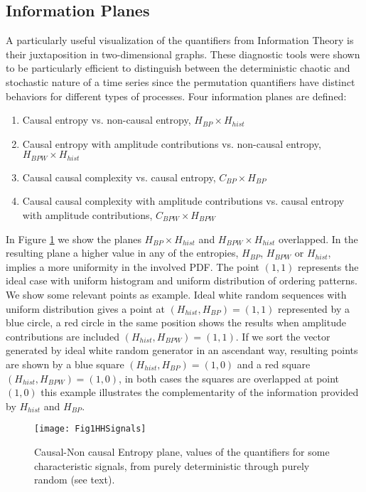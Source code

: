 \subsection{Information Planes}

A particularly useful visualization of the quantifiers from Information Theory is their juxtaposition in two-dimensional graphs.
These diagnostic tools were shown to be particularly efficient to distinguish between the deterministic chaotic and stochastic nature of a time series since the permutation quantifiers have distinct behaviors for different types of processes.
Four information planes are defined:
\begin{enumerate}[leftmargin=*,labelsep=4.9mm]
\item	Causal entropy vs. non-causal entropy, $H_{BP} \times H_{hist}$
\item	Causal entropy with amplitude contributions vs. non-causal entropy, $H_{BPW} \times H_{hist}$
\item	Causal causal complexity vs. causal entropy, $C_{BP} \times H_{BP}$
\item	Causal causal complexity with amplitude contributions vs. causal entropy with amplitude contributions, $C_{BPW} \times H_{BPW}$
\end{enumerate}

In Figure \ref{fig:HH} we show the planes $H_{BP} \times H_{hist}$ and $H_{BPW} \times H_{hist}$ overlapped.
In the resulting plane a higher value in any of the entropies, $H_{BP}$, $H_{BPW}$ or $H_{hist}$, implies a more uniformity in the involved PDF.
The point $(1,1)$ represents the ideal case with uniform histogram and uniform distribution of ordering patterns.
We show some relevant points as example.
Ideal white random sequences with uniform distribution gives a point at $(H_{hist}, H_{BP})=(1, 1)$ represented by a blue circle, a red circle in the same position shows the results when amplitude contributions are included $(H_{hist}, H_{BPW})=(1, 1)$.
If we sort the vector generated by ideal white random generator in an ascendant way, resulting points are shown by a blue square $(H_{hist}, H_{BP})=(1, 0)$ and a red square $(H_{hist}, H_{BPW})=(1, 0)$, in both cases the squares are overlapped at point $(1, 0)$ this example illustrates the complementarity of the information provided by $H_{hist}$ and $H_{BP}$.
%
\begin{figure}[H]
	\centering	
	\texttt{[image: Fig1HHSignals]}
	\caption{Causal-Non causal Entropy plane, values of the quantifiers for some characteristic signals, from purely deterministic through purely random (see text).}
	\label{fig:HH}
\end{figure}

